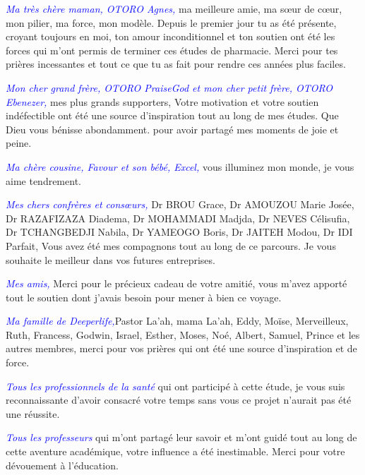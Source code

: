 \noindent \emph{\textcolor{blue}{Ma très chère maman, OTORO Agnes,}} ma meilleure amie, ma sœur de cœur, mon pilier, ma force, mon modèle. Depuis le premier jour tu as été présente, croyant toujours en moi, ton amour inconditionnel et ton soutien ont été les forces qui m'ont permis de terminer ces études de pharmacie. Merci pour tes prières incessantes et tout ce que tu as fait pour rendre ces années plus faciles.\vspace*{1em}

\noindent \emph{\textcolor{blue}{Mon cher grand frère, OTORO PraiseGod et mon cher petit frère, OTORO Ebenezer,}} mes plus grands supporters, Votre motivation et votre soutien indéfectible ont été une source d'inspiration tout au long de mes études. Que Dieu vous bénisse abondamment. pour avoir partagé mes moments de joie et peine.\vspace*{1em}
 
\noindent \emph{\textcolor{blue}{Ma chère cousine, Favour et son bébé, Excel,}} vous illuminez mon monde, je vous aime tendrement.\vspace*{1em} 

\noindent \emph{\textcolor{blue}{Mes chers confrères et consœurs,}} Dr BROU Grace, Dr AMOUZOU Marie Josée, Dr RAZAFIZAZA Diadema, Dr MOHAMMADI Madjda, Dr NEVES Célisufia, Dr TCHANGBEDJI Nabila, Dr YAMEOGO Boris, Dr JAITEH Modou, Dr IDI Parfait, Vous avez été mes compagnons tout au long de ce parcours. Je vous souhaite le meilleur dans vos futures entreprises.\vspace*{1em}

\noindent \emph{\textcolor{blue}{Mes amis,}} Merci pour le précieux cadeau de votre amitié, vous m'avez apporté tout le soutien dont j'avais besoin pour mener à bien ce voyage.\vspace*{1em}

\noindent \emph{\textcolor{blue}{Ma famille de Deeperlife,}}Pastor La'ah, mama La'ah, Eddy, Moïse, Merveilleux, Ruth, Francess, Godwin, Israel, Esther, Moses, Noé, Albert, Samuel, Prince et les autres membres, merci pour vos prières qui ont été une source d'inspiration et de force.  \vspace*{1em} 

\noindent \emph{\textcolor{blue}{Tous les professionnels de la santé}} qui ont participé à cette étude, je vous suis reconnaissante d'avoir consacré votre temps sans vous ce projet n'aurait pas été une réussite. \vspace*{1em}    

\noindent \emph{\textcolor{blue}{Tous les professeurs}} qui m'ont partagé leur savoir et m'ont guidé tout au long de cette aventure académique, votre influence a été inestimable. Merci pour votre dévouement à l'éducation. \vspace*{1em}


